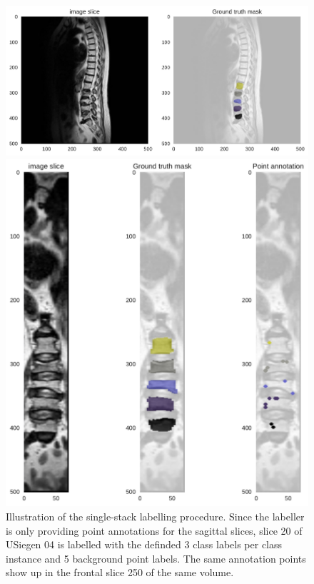 \begin{figure}
    \centering
    \centering
    \begin{minipage}{.99\textwidth}
        \includegraphics[width=.99\textwidth]{images/USiegen004_s20_mask.pdf}
    \end{minipage} 
    \vspace{1 mm}
    \begin{minipage}{.99\textwidth}
        \includegraphics[width=.99\textwidth]{images/USiegen004_s250_front_points.pdf}
    \end{minipage} 
    \vspace{2 mm}
    \caption{Illustration of the single-stack labelling procedure.
    Since the labeller is only providing point annotations for the sagittal slices, slice 20 of USiegen 04 is labelled with the definded 3 class labels per class instance and 5 background point labels.
    The same annotation points show up in the frontal slice 250 of the same volume. 
    \protect}
\end{figure}

